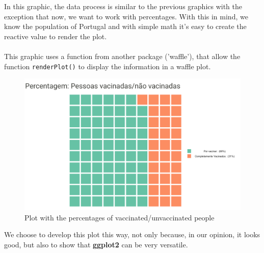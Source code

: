 In this graphic, the data process is similar to the previous graphics with the exception that now, we want to work with percentages. With this in mind, we know the population of Portugal and with simple math it's easy to create the reactive value to render the plot.\\
\\
This graphic uses a function from another package ('waffle'), that allow the function \texttt{renderPlot()} to display the information in a waffle plot. 
\begin{figure}[H]
\centering
\includegraphics[width=350pt,trim=10 0 0 -10mm]{images/p6.png}
\caption{Plot with the percentages of vaccinated/unvaccinated people}
\label{fig:ages-vac-1}
\end{figure}
We choose to develop this plot this way, not only because, in our opinion, it looks good, but also to show that \textbf{ggplot2} can be very versatile.